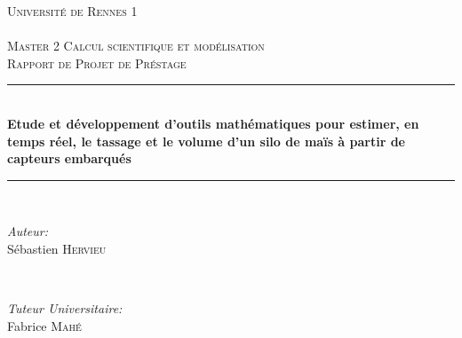 \documentclass[12pt,a4paper]{report}
\author{Sébastien Hervieu}
\begin{document}
\begin{titlepage}

\newcommand{\HRule}{\rule{\linewidth}{0.5mm}} %

\center %
 

\textsc{\LARGE Université de Rennes 1}\\[1cm] 
\textsc{\Large }\\[0.5cm] %
\textsc{\large Master 2 Calcul scientifique et modélisation}\\
\textsc{Rapport de Projet de Préstage}\\

\HRule \\[0.4cm]
{ \huge \bfseries Etude et développement d’outils mathématiques pour estimer, en temps réel, le tassage et le volume d’un silo de maïs à partir de capteurs embarqués}\\[0.4cm] 
\HRule \\[1.5cm]
 

\begin{minipage}{0.4\textwidth}
\begin{flushleft} \large
\emph{Auteur:}\\
Sébastien \textsc{Hervieu}
\end{flushleft}
\end{minipage}
~
\begin{minipage}{0.4\textwidth}
\begin{flushright} \large
\emph{Tuteur Universitaire:} \\
Fabrice \textsc{Mahé} 
\end{flushright}
\end{minipage}\\[1cm]



\end{titlepage}
\end{document}
